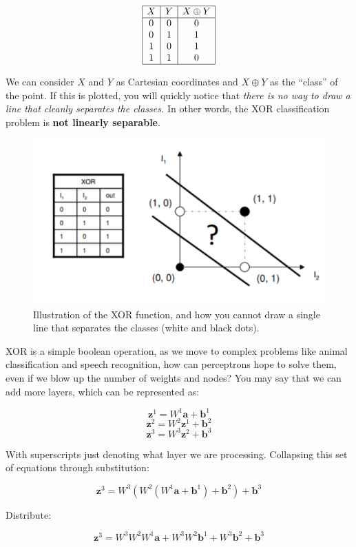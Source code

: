     $$\begin{array}{|c|c|c|}
    \hline
    X & Y & X \oplus Y \\
    \hline
    0 & 0 & 0 \\
    0 & 1 & 1 \\
    1 & 0 & 1 \\
    1 & 1 & 0 \\
    \hline
    \end{array}$$

    We can consider $X$ and $Y$ as Cartesian coordinates and $X \oplus Y$ as the ``class'' of the point. If this is plotted, you will quickly notice that \textit{there is no way to draw a line that cleanly separates the classes.} In other words, the XOR classification problem is \textbf{not linearly separable}.

    \begin{figure}[H]
        \centering
        \includegraphics[width=0.5\linewidth]{dl/xor.png}
        \caption{Illustration of the XOR function, and how you cannot draw a single line that separates the classes (white and black dots).}
        \label{fig:xor}
    \end{figure}
    
    XOR is a simple boolean operation, as we move to complex problems like animal classification and speech recognition, how can perceptrons hope to solve them, even if we blow up the number of weights and nodes? You may say that we can add more layers, which can be represented as:

    $$\textbf{z}^1 = W^1\textbf{a} + \textbf{b}^1$$
    $$\textbf{z}^2 = W^2\textbf{z}^1 + \textbf{b}^2$$
    $$\textbf{z}^3 = W^3\textbf{z}^2 + \textbf{b}^3$$

    With superscripts just denoting what layer we are processing. Collapsing this set of equations through substitution:

    $$\textbf{z}^3 = W^3(W^2(W^1\textbf{a} + \textbf{b}^1) + \textbf{b}^2) + \textbf{b}^3$$

    Distribute:

    $$\textbf{z}^3 = W^3W^2W^1\textbf{a} + W^3W^2\textbf{b}^1 + W^3\textbf{b}^2 + \textbf{b}^3$$

